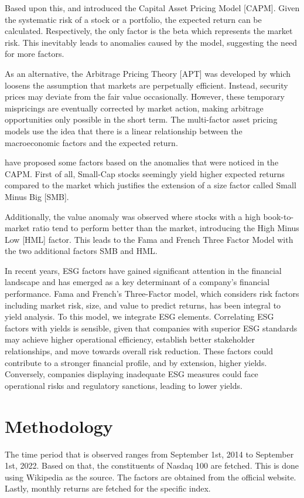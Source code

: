 \documentclass[12pt, a4paper]{article}%
\begin{document}
Based upon this, \textcite{Sharpe1964} and \textcite{Lintner1965} introduced the Capital Asset Pricing Model [CAPM]. Given the systematic risk of a stock or a portfolio, the expected return can be calculated. Respectively, the only factor is the beta which represents the market risk. This inevitably leads to anomalies caused by the model, suggesting the need for more factors.

As an alternative, the Arbitrage Pricing Theory [APT] was developed by \textcite{Ross1976} which loosens the assumption that markets are perpetually efficient. Instead, security prices may deviate from the fair value occasionally. However, these temporary mispricings are eventually corrected by market action, making arbitrage opportunities only possible in the short term.
The multi-factor asset pricing models use the idea that there is a linear relationship between the macroeconomic factors and the expected return.

\textcite{FamaFrench1992} have proposed some factors based on the anomalies that were noticed in the CAPM.
First of all, Small-Cap stocks seemingly yield higher expected returns compared to the market which justifies the extension of a size factor called Small Minus Big [SMB].

Additionally, the value anomaly was observed where stocks with a high book-to-market ratio tend to perform better than the market, introducing the High Minus Low [HML] factor.
This leads to the Fama and French Three Factor Model with the two additional factors SMB and HML.

In recent years, ESG factors have gained significant attention in the financial landscape and has emerged as a key determinant of a company’s financial performance. Fama and French's Three-Factor model, which considers risk factors including market risk, size, and value to predict returns, has been integral to yield analysis. To this model, we integrate ESG elements.
Correlating ESG factors with yields is sensible, given that companies with superior ESG standards may achieve higher operational efficiency, establish better stakeholder relationships, and move towards overall risk reduction. These factors could contribute to a stronger financial profile, and by extension, higher yields. Conversely, companies displaying inadequate ESG measures could face operational risks and regulatory sanctions, leading to lower yields.

\section{Methodology} %
The time period that is observed ranges from September 1st, 2014 to September 1st, 2022. Based on that, the constituents of Nasdaq 100 are fetched. This is done using Wikipedia as the source.
The \textcite{FamaFrench1992} factors are obtained from the official website. 
Lastly, monthly returns are fetched for the specific index. \\%
\end{document}
